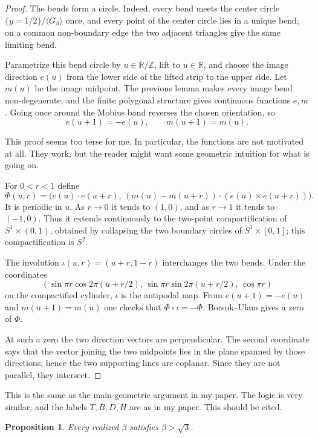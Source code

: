 \documentclass[12pt]{article}
\newtheorem{proposition}{Proposition}
\newcommand{\R}{\mathbb R}
\newcommand{\Z}{\mathbb Z}
\newcommand{\review}[1]{\begin{reviewbox}#1\end{reviewbox}}
\begin{document}
\begin{proof}
The bends form a circle.  Indeed, every bend meets the center circle
\(\{y=1/2\}/\langle G_\beta\rangle\) once, and every point of the center
circle lies in a unique bend; on a common non-boundary edge the two
adjacent triangles give the same limiting bend.

Parametrize this bend circle by \(u\in\R/\Z\), lift to \(u\in\R\), and
choose the image direction \(e(u)\) from the lower side of the lifted
strip to the upper side.  Let \(m(u)\) be the image midpoint.  The
previous lemma makes every image bend non-degenerate, and the finite
polygonal structure gives continuous functions \(e,m\).  Going once
around the Mobius band reverses the chosen orientation, so
\[
        e(u+1)=-e(u),\qquad m(u+1)=m(u).
\]


\review{This proof seems too terse for me.  In particular, the functions are not motivated at all.  They work, but the reader might want some geometric intuition for what is going on.}

For \(0<r<1\) define
\[
 \Phi(u,r)=\Big(e(u)\!\cdot e(u+r),\,
 (m(u)-m(u+r))\!\cdot (e(u)\times e(u+r))\Big).
\]
It is periodic in \(u\).  As \(r\to0\) it tends to \((1,0)\), and as
\(r\to1\) it tends to \((-1,0)\).  Thus it extends continuously to the
two-point compactification of \(S^1\times(0,1)\), obtained by collapsing
the two boundary circles of \(S^1\times[0,1]\); this compactification is
\(S^2\).

The involution \(\iota(u,r)=(u+r,1-r)\) interchanges the two bends.  Under
the coordinates
\[
(\sin\pi r\cos 2\pi(u+r/2),\,\sin\pi r\sin 2\pi(u+r/2),\,\cos\pi r)
\]
on the compactified cylinder, \(\iota\) is the antipodal map.  From
\(e(u+1)=-e(u)\) and \(m(u+1)=m(u)\) one checks that
\(\Phi\circ\iota=-\Phi\).  Borsuk--Ulam gives a zero of \(\Phi\).

At such a zero the two direction vectors are perpendicular.  The second
coordinate says that the vector joining the two midpoints lies in the
plane spanned by those directions; hence the two supporting lines are
coplanar.  Since they are not parallel, they intersect.
\end{proof}


\review{This is the same as the main geometric argument in my paper.  The logic is very similar, and the labels $T,B,D,H$ are as in my paper. This should be cited.}


\begin{proposition}\label{prop:lower}
Every realized \(\beta\) satisfies \(\beta>\sqrt3\).
\end{proposition}
\end{document}
